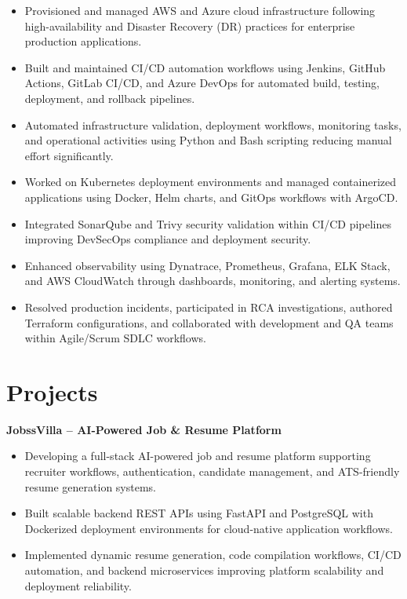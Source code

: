 \documentclass[letterpaper,9pt]{article}
\newcommand{\resumeItem}[1]{
\item \small{#1}
}
\begin{document}
\begin{itemize}

\resumeItem{
Provisioned and managed AWS and Azure cloud infrastructure following high-availability and Disaster Recovery (DR) practices for enterprise production applications.
}

\resumeItem{
Built and maintained CI/CD automation workflows using Jenkins, GitHub Actions, GitLab CI/CD, and Azure DevOps for automated build, testing, deployment, and rollback pipelines.
}

\resumeItem{
Automated infrastructure validation, deployment workflows, monitoring tasks, and operational activities using Python and Bash scripting reducing manual effort significantly.
}

\resumeItem{
Worked on Kubernetes deployment environments and managed containerized applications using Docker, Helm charts, and GitOps workflows with ArgoCD.
}

\resumeItem{
Integrated SonarQube and Trivy security validation within CI/CD pipelines improving DevSecOps compliance and deployment security.
}

\resumeItem{
Enhanced observability using Dynatrace, Prometheus, Grafana, ELK Stack, and AWS CloudWatch through dashboards, monitoring, and alerting systems.
}

\resumeItem{
Resolved production incidents, participated in RCA investigations, authored Terraform configurations, and collaborated with development and QA teams within Agile/Scrum SDLC workflows.
}

\end{itemize}


\section{Projects}

\textbf{JobssVilla -- AI-Powered Job \& Resume Platform}
\begin{itemize}

\resumeItem{
Developing a full-stack AI-powered job and resume platform supporting recruiter workflows, authentication, candidate management, and ATS-friendly resume generation systems.
}

\resumeItem{
Built scalable backend REST APIs using FastAPI and PostgreSQL with Dockerized deployment environments for cloud-native application workflows.
}

\resumeItem{
Implemented dynamic resume generation, code compilation workflows, CI/CD automation, and backend microservices improving platform scalability and deployment reliability.
}

\end{itemize}
\end{document}
